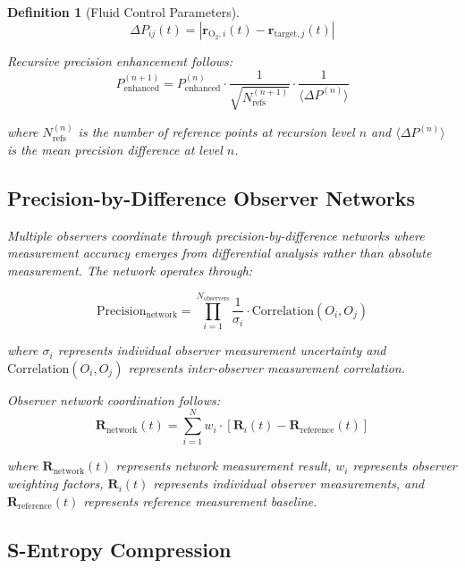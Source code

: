 \documentclass[12pt,a4paper]{article}
\newtheorem{definition}{Definition}
\begin{document}
\begin{definition}[Fluid Control Parameters]
\begin{equation}
\Delta P_{ij}(t) = |\mathbf{r}_{\text{O}_2,i}(t) - \mathbf{r}_{\text{target},j}(t)|
\end{equation}

Recursive precision enhancement follows:
\begin{equation}
P_{\text{enhanced}}^{(n+1)} = P_{\text{enhanced}}^{(n)} \cdot \frac{1}{\sqrt{N_{\text{refs}}^{(n+1)}}} \cdot \frac{1}{\langle\Delta P^{(n)}\rangle}
\end{equation}

where $N_{\text{refs}}^{(n)}$ is the number of reference points at recursion level $n$ and $\langle\Delta P^{(n)}\rangle$ is the mean precision difference at level $n$.

\subsection{Precision-by-Difference Observer Networks}

Multiple observers coordinate through precision-by-difference networks where measurement accuracy emerges from differential analysis rather than absolute measurement. The network operates through:

\begin{equation}
\text{Precision}_{\text{network}} = \prod_{i=1}^{N_{\text{observers}}} \frac{1}{\sigma_i} \cdot \text{Correlation}(O_i, O_j)
\end{equation}

where $\sigma_i$ represents individual observer measurement uncertainty and $\text{Correlation}(O_i, O_j)$ represents inter-observer measurement correlation.

Observer network coordination follows:
\begin{equation}
\mathbf{R}_{\text{network}}(t) = \sum_{i=1}^{N} w_i \cdot [\mathbf{R}_i(t) - \mathbf{R}_{\text{reference}}(t)]
\end{equation}

where $\mathbf{R}_{\text{network}}(t)$ represents network measurement result, $w_i$ represents observer weighting factors, $\mathbf{R}_i(t)$ represents individual observer measurements, and $\mathbf{R}_{\text{reference}}(t)$ represents reference measurement baseline.

\subsection{S-Entropy Compression}


\end{definition}
\end{document}
